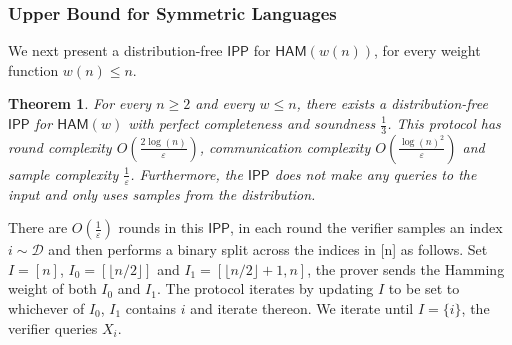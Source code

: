 \documentclass[11pt]{article}
\newtheorem{theorem}{Theorem}[section]
\newcommand{\HAM}{\mathsf{HAM}}
\newcommand{\IPP}{\mathsf{IPP}}
\begin{document}
\subsubsection{Upper Bound for Symmetric Languages}
\label{sec:hamming}
We next present a distribution-free $\IPP$ for $\HAM(w(n))$, for every weight function $w(n) \leq n$. 
\begin{theorem}
\label{thm:ham_dfipp}
For every $n \geq 2$ and every $w \leq n$, there exists a distribution-free $\IPP$ for $\HAM(w)$ with perfect completeness and soundness $\frac{1}{3}$. This protocol has round complexity $O\left(\frac{2\log(n)}{\varepsilon}\right)$, communication complexity $O \left( \frac{\log(n)^{2}}{\varepsilon} \right)$ and sample complexity $\frac{1}{\varepsilon}$. Furthermore, the $\IPP$ does not make any queries to the input and only uses samples from the distribution.
\end{theorem}
 
There are $O\left(\frac{1}{\varepsilon}\right)$ rounds in this $\IPP$, in each round the verifier samples an index $i\sim \mathcal{D}$ and then performs a binary split across the indices in [n] as follows. Set $I=[n]$, $I_{0}=[\lfloor n/2\rfloor ]$ and $I_{1}=[\lfloor n/2 \rfloor + 1,n]$, the prover sends the Hamming weight of both $I_{0}$ and $I_{1}$. The protocol iterates by updating $I$ to be set to whichever of $I_{0}$, $I_{1}$ contains $i$ and iterate thereon. We iterate until $I=\{i\}$, the verifier queries $X_{i}$. 
\end{document}
